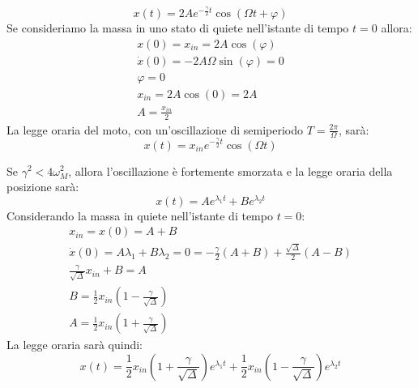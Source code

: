 \documentclass{article}
\numberwithin{equation}{subsection}
\begin{document}
\begin{equation}
    x(t)=2Ae^{-\frac{\gamma}{2}t}\cos\left(\Omega t +\varphi\right) 
\end{equation}
Se consideriamo la massa in uno stato di quiete nell'istante 
di tempo $t=0$ allora:
\begin{gather*}
    x(0)=x_{in}=2A\cos(\varphi)\\
    \dot x(0)=-2A\Omega \sin(\varphi)=0\\
    \varphi=0\\
    x_{in}=2A\cos(0)=2A\\
    A=\displaystyle\frac{x_{in}}{2}
\end{gather*}
La legge oraria del moto, con un'oscillazione di 
semiperiodo $T=\displaystyle\frac{2\pi}{\Omega}$, sarà: 
\begin{equation}
    x(t)=x_{in}e^{-\frac{\gamma}{2}t}\cos(\Omega t)
\end{equation}

\begin{center}\end{center}

Se $\gamma^{2}<4\omega_M^{2}$, allora l'oscillazione è fortemente 
smorzata e la legge oraria della posizione sarà:
\begin{equation*}
    x(t)=Ae^{\lambda_1t}+Be^{\lambda_2t}
\end{equation*}
Considerando la massa in quiete nell'istante di tempo $t=0$: 
\begin{gather*}
    x_{in}=x(0)=A+B\\
    \dot x(0)=A\lambda_1+B\lambda_2=0=-\displaystyle\frac{\gamma}{2}(A+B)+\frac{\sqrt{\Delta}}{2}(A-B)\\
    \displaystyle\frac{\gamma}{\sqrt{\Delta}}x_{in}+B=A\\
    B=\displaystyle\frac{1}{2}x_{in}\left(1-\displaystyle\frac{\gamma}{\sqrt{\Delta}}\right)\\
    A=\displaystyle\frac{1}{2}x_{in}\left(1+\displaystyle\frac{\gamma}{\sqrt{\Delta}}\right)
\end{gather*}
La legge oraria sarà quindi:
\begin{equation}
    x(t)=\displaystyle\frac{1}{2}x_{in}\left(1+\displaystyle\frac{\gamma}{\sqrt{\Delta}}\right)e^{\lambda_1t}+\displaystyle\frac{1}{2}x_{in}\left(1-\displaystyle\frac{\gamma}{\sqrt{\Delta}}\right)e^{\lambda_2t}
\end{equation}
\end{document}
